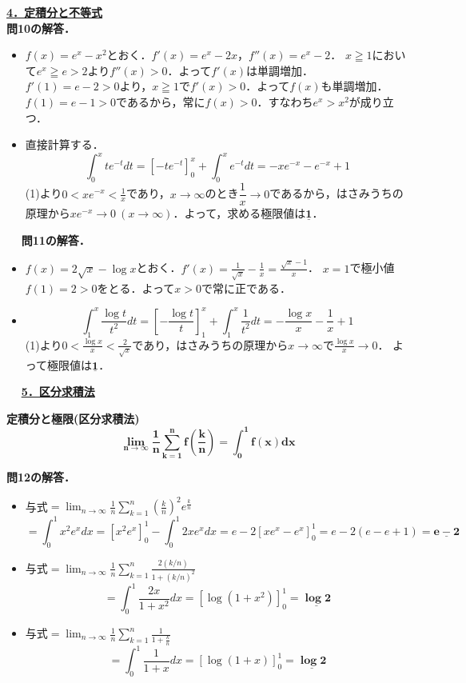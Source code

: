 \documentclass[a4paper,11pt]{ltjsarticle}
\begin{document}
\noindent \underline{{\large{\textbf{4．定積分と不等式}}}}
　\\
\noindent\textbf{問10の解答．}\\[5pt]
\begin{itemize}
    \item [(1)]$\displaystyle{f(x)=e^x-x^2}$とおく．$\displaystyle{f'(x)=e^x-2x}$，$\displaystyle{f''(x)=e^x-2}$．
    $\displaystyle{x\geqq 1}$において$\displaystyle{e^x\geqq e > 2}$より$\displaystyle{f''(x)>0}$．よって$\displaystyle{f'(x)}$は単調増加．
    $\displaystyle{f'(1)=e-2>0}$より，$\displaystyle{x\geqq 1}$で$\displaystyle{f'(x)>0}$．よって$\displaystyle{f(x)}$も単調増加．
    $\displaystyle{f(1)=e-1>0}$であるから，常に$\displaystyle{f(x)>0}$．すなわち$\displaystyle{e^x>x^2}$が成り立つ．
    \item [(2)]直接計算する．
    \[\int_0^x te^{-t}dt = [-te^{-t}]_0^x + \int_0^x e^{-t}dt = -xe^{-x} -e^{-x} + 1\]
    (1)より$\displaystyle{0<xe^{-x}<\frac1x}$であり，$x\to\infty$のとき$\dfrac1x\to0$であるから，はさみうちの原理から$\displaystyle{xe^{-x}\to 0~(x\to \infty)}$．よって，求める極限値は$\displaystyle{\underline{\boldsymbol{1}}}$．
\end{itemize}
　
\noindent\textbf{問11の解答．}\\[5pt]
\begin{itemize}
    \item [(1)]$\displaystyle{f(x)=2\sqrt{x}-\log x}$とおく．$\displaystyle{f'(x)=\frac{1}{\sqrt{x}}-\frac{1}{x}=\frac{\sqrt{x}-1}{x}}$．
    $\displaystyle{x=1}$で極小値$\displaystyle{f(1)=2>0}$をとる．よって$\displaystyle{x>0}$で常に正である．
    \item [(2)]
    \[\int_1^x \frac{\log t}{t^2}dt = \left[-\frac{\log t}{t}\right]_1^x + \int_1^x \frac{1}{t^2}dt = -\frac{\log x}{x} - \frac{1}{x} + 1\]
    (1)より$\displaystyle{0<\frac{\log x}{x}<\frac{2}{\sqrt{x}}}$であり，はさみうちの原理から$\displaystyle{x\to\infty}$で$\displaystyle{\frac{\log x}{x}\to 0}$．
    よって極限値は$\displaystyle{\underline{\boldsymbol{1}}}$．
\end{itemize}
　
\newpage
\noindent \underline{{\large{\textbf{5．区分求積法}}}}
\begin{rembox}
    \textbf{定積分と極限(区分求積法)}
    \[\boldsymbol{\lim_{n\to\infty}\frac{1}{n}\sum_{k=1}^nf\left(\frac kn\right)=\int_0^1 f(x)dx}\]
\end{rembox}
\noindent\textbf{問12の解答．}\\[5pt]
\begin{itemize}
    \item [(1)]与式$\displaystyle{=\lim_{n\to\infty}\frac{1}{n}\sum_{k=1}^n \left(\frac{k}{n}\right)^2 e^{\frac{k}{n}}}$
    \[=\int_0^1 x^2e^x dx = [x^2e^x]_0^1 - \int_0^1 2xe^x dx = e - 2[xe^x-e^x]_0^1 = e - 2(e-e+1) = \underline{\boldsymbol{e-2}}\]
     \item [(2)]与式$\displaystyle{=\lim_{n\to\infty}\frac{1}{n}\sum_{k=1}^n \frac{2(k/n)}{1+(k/n)^2}}$
     \[=\int_0^1 \frac{2x}{1+x^2}dx = [\log(1+x^2)]_0^1 = \underline{\boldsymbol{\log 2}}\]
          \item [(3)]与式$\displaystyle{=\lim_{n\to\infty}\frac{1}{n}\sum_{k=1}^n\frac{1}{1+\frac{k}{n}}}$
          \[=\int_0^1 \frac{1}{1+x}dx = [\log(1+x)]_0^1 = \underline{\boldsymbol{\log 2}}\]
\end{itemize}
\end{document}
